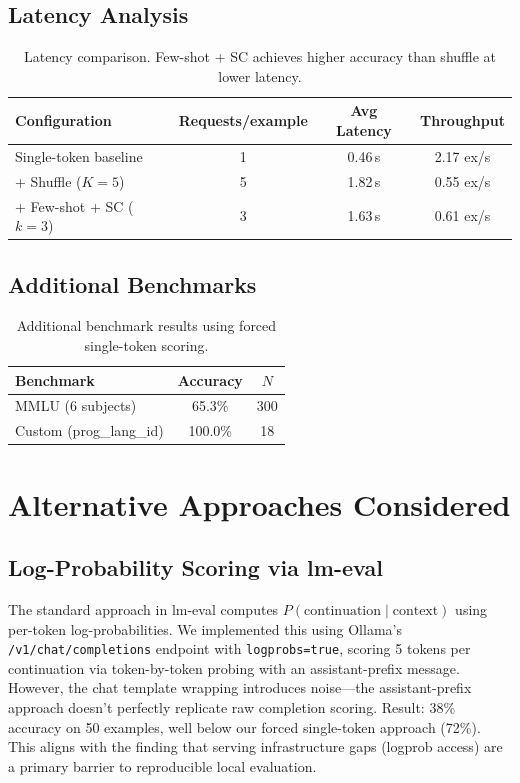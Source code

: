 \documentclass[11pt]{article}
\begin{document}
\subsection{Latency Analysis}

\begin{table}[h]
\centering
\begin{tabular}{@{}lccc@{}}
\toprule
Configuration & Requests/example & Avg Latency & Throughput \\
\midrule
Single-token baseline & 1 & 0.46\,s & 2.17 ex/s \\
+ Shuffle ($K{=}5$) & 5 & 1.82\,s & 0.55 ex/s \\
+ Few-shot + SC ($k{=}3$) & 3 & 1.63\,s & 0.61 ex/s \\
\bottomrule
\end{tabular}
\caption{Latency comparison. Few-shot + SC achieves higher accuracy than shuffle at lower latency.}
\label{tab:latency}
\end{table}

\subsection{Additional Benchmarks}

\begin{table}[h]
\centering
\begin{tabular}{@{}lcc@{}}
\toprule
Benchmark & Accuracy & $N$ \\
\midrule
MMLU (6 subjects) & 65.3\% & 300 \\
Custom (prog\_lang\_id) & 100.0\% & 18 \\
\bottomrule
\end{tabular}
\caption{Additional benchmark results using forced single-token scoring.}
\label{tab:additional}
\end{table}

\section{Alternative Approaches Considered}

\subsection{Log-Probability Scoring via lm-eval}

The standard approach in lm-eval computes $P(\text{continuation} \mid \text{context})$ using per-token log-probabilities. We implemented this using Ollama's \texttt{/v1/chat/completions} endpoint with \texttt{logprobs=true}, scoring 5 tokens per continuation via token-by-token probing with an assistant-prefix message. However, the chat template wrapping introduces noise---the assistant-prefix approach doesn't perfectly replicate raw completion scoring. Result: 38\% accuracy on 50 examples, well below our forced single-token approach (72\%). This aligns with the finding that serving infrastructure gaps (logprob access) are a primary barrier to reproducible local evaluation.
\end{document}
